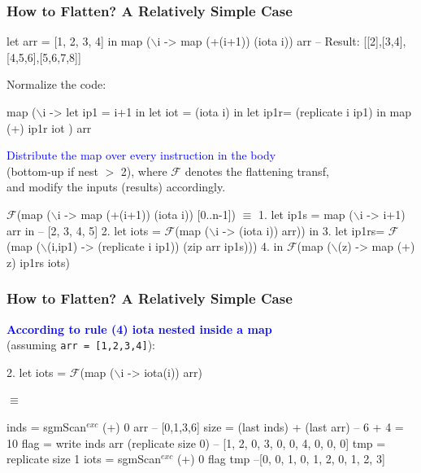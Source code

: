 \documentclass{beamer}
\newcommand{\blue}[1]{\textcolor{Blue}{{#1}}}
\renewcommand{\emph}[1]{\textcolor{structure}{#1}}
\newcommand{\emp}[1]{\textcolor{DikuRed}{ #1}}
\newcommand{\mymath}[1]{$ #1 $}
\newcommand{\myindu}[1]{^{#1}}
\begin{document}
\begin{frame}[fragile,t]
  \frametitle{How to Flatten? A Relatively Simple Case}
\begin{colorcode}
let arr = [1, 2, 3, 4] in
\alert{map (\mymath{\backslash}i -> map (+(i+1)) (iota i)) arr}
-- Result: [[2],[3,4],[4,5,6],[5,6,7,8]]
\end{colorcode}
\bigskip
\pause

Normalize the code:
\begin{colorcode}
map (\mymath{\backslash}i -> let ip1 = i+1 in
           let iot = (iota i) in
           let ip1r= (replicate i ip1) in
           map (+) ip1r iot            ) arr
\end{colorcode}
\bigskip

\blue{Distribute the map over every instruction in the body}\\
(bottom-up if nest $>$ 2), where $\mathcal{F}$ denotes the flattening transf,\\
and modify the inputs (results) accordingly.
\bigskip
\pause

\begin{colorcode}
\mymath{\mathcal{F}}(\alert{map (\mymath{\backslash}i -> map (+(i+1)) (iota i)) [0..n-1]}) \mymath{\equiv}
1. let ip1s = map (\mymath{\backslash}i -> i+1) arr in -- [2, 3, 4, 5]
2. let iots = \mymath{\mathcal{F}}(map (\mymath{\backslash}i -> (iota i)) arr)) in
3. let ip1rs= \mymath{\mathcal{F}}(map (\mymath{\backslash}(i,ip1) -> (replicate i ip1)) (zip arr ip1s)))
4. in  \mymath{\mathcal{F}}(map (\mymath{\backslash}(z) -> map (+) z) ip1rs iots)
\end{colorcode}

\end{frame}



\begin{frame}[fragile,t]
  \frametitle{How to Flatten? A Relatively Simple Case}

\blue{\bf According to rule (4) iota nested inside a map}\\
(assuming {\tt arr = [1,2,3,4]}):
\bigskip

\begin{colorcode}
2. let iots = \mymath{\mathcal{F}}(map (\mymath{\backslash}i -> iota(i)) arr)

\mymath{\equiv}

inds = sgmScan\mymath{\myindu{exc}} (+) 0 arr -- [0,1,3,6]
size = (last inds) + (last arr) -- 6 + 4 = 10
flag = write inds arr 
             (replicate size 0)
--           [1, 2, 0, 3, 0, 0, 4, 0, 0, 0]
tmp  = replicate size 1
iots = sgmScan\mymath{\myindu{exc}} (+) 0 flag \emp{tmp} \emph{--[0, 0, 1, 0, 1, 2, 0, 1, 2, 3]}
\end{colorcode}

\end{frame}
\end{document}
